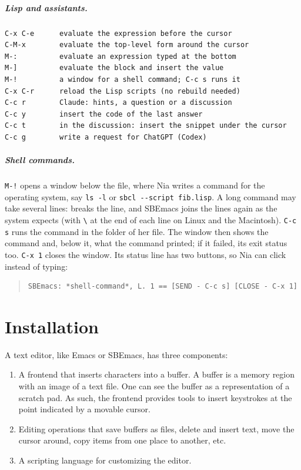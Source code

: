 \documentclass[a4paper,12pt,openany]{book}
\begin{document}
\paragraph{Lisp and assistants.}
\begin{verbatim}
C-x C-e      evaluate the expression before the cursor
C-M-x        evaluate the top-level form around the cursor
M-:          evaluate an expression typed at the bottom
M-]          evaluate the block and insert the value
M-!          a window for a shell command; C-c s runs it
C-x C-r      reload the Lisp scripts (no rebuild needed)
C-c r        Claude: hints, a question or a discussion
C-c y        insert the code of the last answer
C-c t        in the discussion: insert the snippet under the cursor
C-c g        write a request for ChatGPT (Codex)
\end{verbatim}

\paragraph{Shell commands.} \verb|M-!| opens a window below the file,
where Nia writes a command for the operating system, say
\verb|ls -l| or \verb|sbcl --script fib.lisp|. A long command may
take several lines:  breaks the line, and SBEmacs joins
the lines again as the system expects (with \verb|\| at the end of
each line on Linux and the Macintosh). \verb|C-c s| runs the command
in the folder of her file. The window then shows the command and,
below it, what the command printed; if it failed, its exit status
too. \verb|C-x 1| closes the window. Its status line has two
buttons, so Nia can click instead of typing:
\begin{quote}
\begin{verbatim}
SBEmacs: *shell-command*, L. 1 == [SEND - C-c s] [CLOSE - C-x 1]
\end{verbatim}
\end{quote}

\chapter{Installation}

A text editor, like Emacs or SBEmacs, has three components:
\begin{enumerate}
\item A frontend that inserts characters into a buffer.
A buffer is a memory region with an image of a
text file. One can see the buffer as a representation
of a scratch pad. As such, the frontend provides tools to
insert keystrokes at the  point indicated by
a movable cursor.
\item Editing operations that save buffers
as files, delete and insert text, move the
cursor around, copy items from one place to another, etc.
\item A scripting language for customizing the editor.
\end{enumerate}
\end{document}
